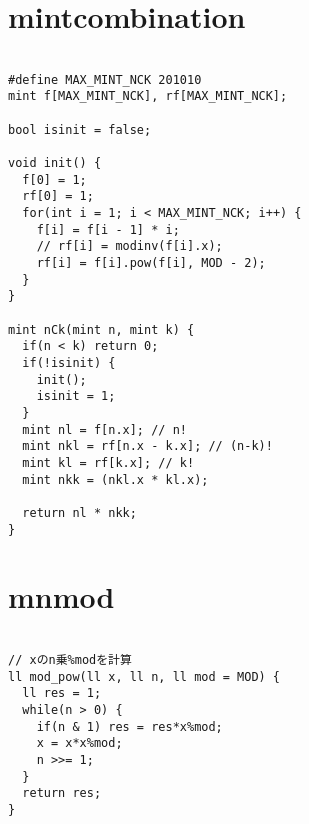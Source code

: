 \documentclass{jsarticle}
\begin{document}
\section{mintcombination}
\color{black}
\begin{lstlisting}[caption=mintcombination]

#define MAX_MINT_NCK 201010
mint f[MAX_MINT_NCK], rf[MAX_MINT_NCK];

bool isinit = false;

void init() {
  f[0] = 1;
  rf[0] = 1;
  for(int i = 1; i < MAX_MINT_NCK; i++) {
    f[i] = f[i - 1] * i;
    // rf[i] = modinv(f[i].x);
    rf[i] = f[i].pow(f[i], MOD - 2);
  }
}

mint nCk(mint n, mint k) {
  if(n < k) return 0;
  if(!isinit) {
    init();
    isinit = 1;
  }
  mint nl = f[n.x]; // n!
  mint nkl = rf[n.x - k.x]; // (n-k)!
  mint kl = rf[k.x]; // k!
  mint nkk = (nkl.x * kl.x);

  return nl * nkk;
}

\end{lstlisting}

\color{white}
\section{mnmod}
\color{black}
\begin{lstlisting}[caption=mnmod]

// xのn乗%modを計算
ll mod_pow(ll x, ll n, ll mod = MOD) {
  ll res = 1;
  while(n > 0) {
    if(n & 1) res = res*x%mod;
    x = x*x%mod;
    n >>= 1;
  }
  return res;
}

\end{lstlisting}

\color{white}
\end{document}
